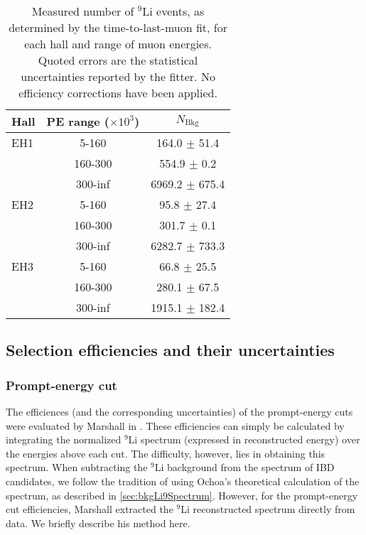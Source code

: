 \documentclass[../thesis.tex]{subfiles}
\begin{document}
\begin{table}[h]
  \centering
  \begin{tabular}{lcc}
    \toprule
    Hall & PE range ($\times10^3$) & $N_{\mathrm{Bkg}}$ \\
    \midrule
    EH1  & 5-160   & 164.0 $\pm$ 51.4 \\
         & 160-300 & 554.9 $\pm$ 0.2 \\
         & 300-inf & 6969.2 $\pm$ 675.4 \\
    \midrule
    EH2  & 5-160   & 95.8 $\pm$ 27.4 \\
         & 160-300 & 301.7 $\pm$ 0.1 \\
         & 300-inf & 6282.7 $\pm$ 733.3 \\
    \midrule
    EH3  & 5-160   & 66.8 $\pm$ 25.5 \\
         & 160-300 & 280.1 $\pm$ 67.5 \\
         & 300-inf & 1915.1 $\pm$ 182.4 \\
    \bottomrule
  \end{tabular}
  \caption{Measured number of $^9$Li events, as determined by the time-to-last-muon fit, for each hall and range of muon energies. Quoted errors are the statistical uncertainties reported by the fitter. No efficiency corrections have been applied.}
  \label{tab:bkgLi9Rates}
\end{table}

\subsection{Selection efficiencies and their uncertainties}
\label{sec:bkgLi9SelEffs}

\subsubsection{Prompt-energy cut}
\label{sec:bkgLi9PromptCutEff}

The efficiences (and the corresponding uncertainties) of the prompt-energy cuts were evaluated by Marshall in \cite{ChrisLi9}. These efficiencies can simply be calculated by integrating the normalized $^9$Li spectrum (expressed in reconstructed energy) over the energies above each cut. The difficulty, however, lies in obtaining this spectrum. When subtracting the $^9$Li background from the spectrum of IBD candidates, we follow the tradition of using Ochoa's theoretical calculation of the spectrum, as described in \autoref{sec:bkgLi9Spectrum}. However, for the prompt-energy cut efficiencies, Marshall extracted the $^9$Li reconstructed spectrum directly from data.
We briefly describe his method here.
\end{document}
